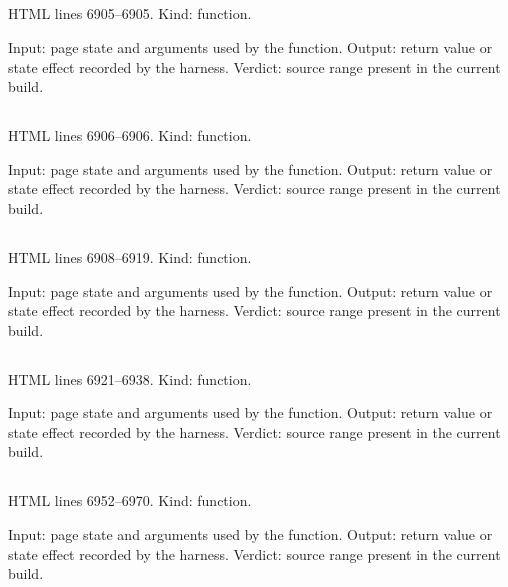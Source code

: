\subsection*{\texttt{}}
\label{vf_332_ccRemember}
HTML lines 6905--6905. Kind: function.

Input: page state and arguments used by the function.
Output: return value or state effect recorded by the harness.
Verdict: source range present in the current build.

\subsection*{\texttt{}}
\label{vf_333_ccRestore}
HTML lines 6906--6906. Kind: function.

Input: page state and arguments used by the function.
Output: return value or state effect recorded by the harness.
Verdict: source range present in the current build.

\subsection*{\texttt{}}
\label{vf_334_ccEvents}
HTML lines 6908--6919. Kind: function.

Input: page state and arguments used by the function.
Output: return value or state effect recorded by the harness.
Verdict: source range present in the current build.

\subsection*{\texttt{}}
\label{vf_335_wirePanel}
HTML lines 6921--6938. Kind: function.

Input: page state and arguments used by the function.
Output: return value or state effect recorded by the harness.
Verdict: source range present in the current build.

\subsection*{\texttt{}}
\label{vf_336_effWol}
HTML lines 6952--6970. Kind: function.

Input: page state and arguments used by the function.
Output: return value or state effect recorded by the harness.
Verdict: source range present in the current build.

